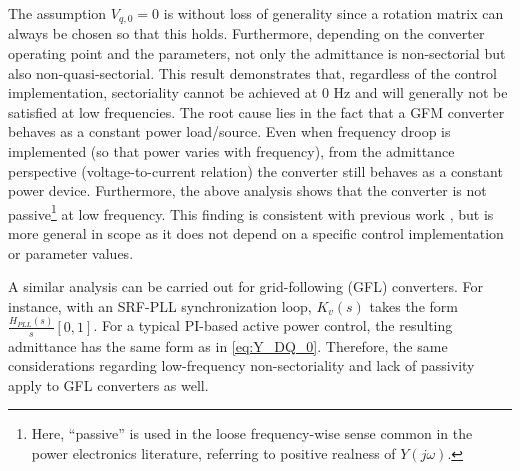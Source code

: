 The assumption $V_{q,0}=0$ is without loss of generality since a rotation matrix can always be chosen so that this holds. Furthermore, depending on the converter operating point and the parameters, not only the admittance is non-sectorial but also non-quasi-sectorial.
This result demonstrates that, regardless of the control implementation, sectoriality cannot be achieved at 0 Hz and will generally not be satisfied at low frequencies. The root cause lies in the fact that a GFM converter behaves as a constant power load/source. Even when frequency droop is implemented (so that power varies with frequency), from the admittance perspective (voltage-to-current relation) the converter still behaves as a constant power device.
Furthermore, the above analysis shows that the converter is not passive\footnote{Here, “passive” is used in the loose frequency-wise sense common in the power electronics literature, referring to positive realness of $Y(j\omega)$.} at low frequency. This finding is consistent with previous work \cite{deyAnalysisPassivityCharacteristics2021}, but is more general in scope as it does not depend on a specific control implementation or parameter values.

\begin{rem}
    A similar analysis can be carried out for grid-following (GFL) converters. For instance, with an SRF-PLL synchronization loop, 
    $K_v(s)$ takes the form $\frac{H_{PLL}(s)}{s}[0,1]$.
    For a typical PI-based active power control, the resulting admittance has the same form as in \eqref{eq:Y_DQ_0}. 
    Therefore, the same considerations regarding low-frequency non-sectoriality and lack of passivity apply to GFL converters as well.
\end{rem}